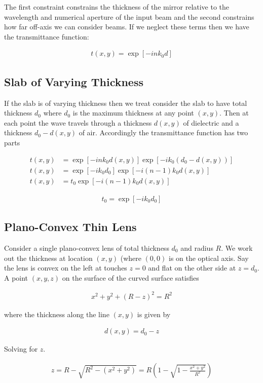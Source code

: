 \documentclass[12pt]{article}
\begin{document}
The first constraint constrains the thickness of the mirror relative to the wavelength and numerical aperture of the input beam and the second constrains how far off-axis we can consider beams. If we neglect these terms then we have the transmittance function:

\begin{align}
t(x,y) = \exp[-in k_0d]
\end{align}

\subsection{Slab of Varying Thickness}
If the slab is of varying thickness then we treat consider the slab to have total thickness $d_0$ where $d_0$ is the maximum thickness at any point $(x,y)$. Then at each point the wave travels through a thickness $d(x,y)$ of dielectric and a thickness $d_0 - d(x,y)$ of air. Accordingly the transmittance function has two parts

\begin{align}
t(x,y) &= \exp[-in k_0d(x,y)]\exp[-i k_0 (d_0-d(x,y))]\\
t(x,y) &= \exp[-ik_0d_0] \exp[-i (n-1)k_0 d(x,y)]\\
t(x,y) &= t_0 \exp[-i (n-1)k_0 d(x,y)]
\end{align}

\begin{align}
t_0 = \exp[-ik_0d_0]
\end{align}
\subsection{Plano-Convex Thin Lens}
Consider a single plano-convex lens of total thickness $d_0$ and radius $R$. We work out the thickness at location $(x,y)$ (where $(0,0)$ is on the optical axis. Say the lens is convex on the left at touches $z=0$ and flat on the other side at $z=d_0$. A point $(x,y,z)$ on the surface of the curved surface satisfies

\begin{align}
x^2+y^2+(R-z)^2 = R^2
\end{align}

where the thickness along the line $(x,y)$ is given by

\begin{align}
d(x,y) = d_0 - z
\end{align}

Solving for $z$.

\begin{align}
z= R - \sqrt{R^2 - (x^2+y^2)} = R\left(1-\sqrt{1 - \frac{x^2+y^2}{R^2}}\right)
\end{align}
\end{document}
